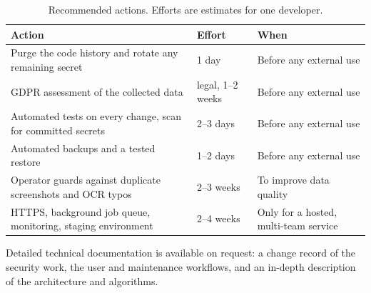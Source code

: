 \documentclass[10pt,a4paper]{scrartcl}
\begin{document}
  \begin{table}[h]
  \small
  \centering
  \renewcommand{\arraystretch}{1.1}
  \begin{tabularx}{\textwidth}{@{}L{6.4cm} L{2.4cm} X@{}}
  \toprule
  \textbf{Action} & \textbf{Effort} & \textbf{When} \\[.3cm]
  \midrule
  Purge the code history and rotate any remaining secret & 1 day & Before any external use \\[.3cm]
  GDPR assessment of the collected data & legal, 1--2 weeks & Before any external use \\[.3cm]
  Automated tests on every change, scan for committed secrets & 2--3 days & Before any external use \\[.3cm]
  Automated backups and a tested restore & 1--2 days & Before any external use \\[.3cm]
  Operator guards against duplicate screenshots and OCR typos & 2--3 weeks & To improve data quality \\[.3cm]
  HTTPS, background job queue, monitoring, staging environment & 2--4 weeks & Only for a hosted, multi-team service \\[.3cm]
  \bottomrule
  \end{tabularx}
  \caption{Recommended actions. Efforts are estimates for one developer.}
  \label{tab:next}
  \end{table}

  Detailed technical documentation is available on request: a change record of the security work, the user
  and maintenance workflows, and an in-depth description of the architecture and algorithms.

  
\end{document}
